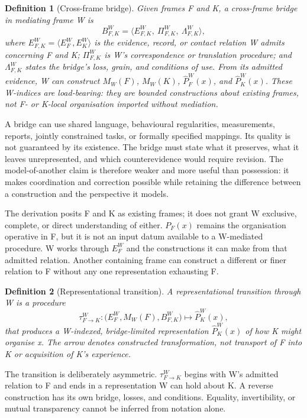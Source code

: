\documentclass[11pt,a4paper]{article}
\newtheorem{definition}{Definition}[section]
\theoremstyle{remark}
\begin{document}
\begin{definition}[Cross-frame bridge]
Given frames F and K, a \emph{cross-frame bridge} in mediating frame W is
\[
 B^W_{F,K}=\langle E^W_{F,K},\ \Pi^W_{F,K},\ \Lambda^W_{F,K}\rangle,
\]
where $E^W_{F,K}=\langle E^W_F,E^W_K\rangle$ is the evidence, record, or
contact relation W admits concerning F and K; $\Pi^W_{F,K}$ is W's
correspondence or translation procedure; and $\Lambda^W_{F,K}$ states the
bridge's loss, grain, and conditions of use. From its admitted evidence, W can
construct $M_W(F)$, $M_W(K)$, $\widehat P^W_F(x)$, and
$\widehat P^W_K(x)$. These W-indices are load-bearing: they are bounded
constructions about existing frames, not F- or K-local organisation imported
without mediation.
\end{definition}

A bridge can use shared language, behavioural regularities, measurements,
reports, jointly constrained tasks, or formally specified mappings. Its quality
is not guaranteed by its existence. The bridge must state what it preserves, what
it leaves unrepresented, and which counterevidence would require revision. The
model-of-another claim is therefore weaker and more useful than possession: it
makes coordination and correction possible while retaining the difference
between a construction and the perspective it models.

The derivation posits F and K as existing frames; it does not grant W exclusive,
complete, or direct understanding of either. $P_F(x)$ remains the organisation
operative in F, but it is not an input datum available to a W-mediated procedure.
W works through $E^W_F$ and the constructions it can make from that admitted
relation. Another containing frame can construct a different or finer relation
to F without any one representation exhausting F.

\begin{definition}[Representational transition]
A \emph{representational transition} through W is a procedure
\[
 \tau^W_{F\to K}:\bigl(E^W_F,M_W(F),B^W_{F,K}\bigr)
 \longmapsto \widehat P^W_K(x),
\]
that produces a W-indexed, bridge-limited representation $\widehat P^W_K(x)$ of
how K might organise x. The arrow denotes constructed transformation, not
transport of F into K or acquisition of K's experience.
\end{definition}

The transition is deliberately asymmetric. $\tau^W_{F\to K}$ begins with W's
admitted relation to F and ends in a representation W can hold about K. A reverse
construction has its own bridge, losses, and conditions. Equality, invertibility,
or mutual transparency cannot be inferred from notation alone.
\end{document}
